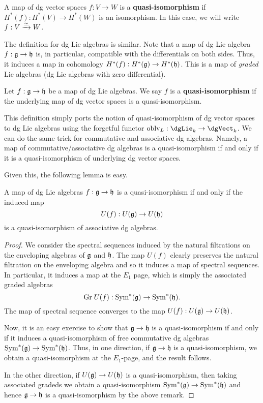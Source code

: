 \documentclass[11pt]{amsart}
\begin{document}
\begin{dfn}
A map of dg vector spaces $f : V \to W$ is a {\bf quasi-isomorphism} if $H^*(f) : H^*(V) \to H^*(W)$ is an isomorphism. 
In this case, we will write $f : V \xrightarrow{\simeq} W$. 
\end{dfn}

The definition for dg Lie algebras is similar. 
Note that a map of dg Lie algebra $f : \mathfrak g \to \mathfrak h$ is, in particular, compatible with the differentials on both sides. 
Thus, it induces a map in cohomology $H^*(f) : H^*(\mathfrak g) \to H^*(\mathfrak h)$.
This is a map of {\em graded} Lie algebras (dg Lie algebras with zero differential). 

\begin{dfn}
Let $f : \mathfrak g \to \mathfrak h$ be a map of dg Lie algebras. 
We say $f$ is a {\bf quasi-isomorphism} if the underlying map of dg vector spaces is a quasi-isomorphism.
\end{dfn}

This definition simply ports the notion of quasi-isomorphism of dg vector spaces to dg Lie algebras using the forgetful functor $\oblv_L : \dgLie_k \to \dgVect_k$. 
We can do the same trick for commutative and associative dg algebras.
Namely, a map of commutative/associative dg algebras is a quasi-isomorphism if and only if it is a quasi-isomorphism of underlying dg vector spaces. 

Given this, the following lemma is easy. 

\begin{lem}
A map of dg Lie algebras $f : \mathfrak g \to \mathfrak h$ is a quasi-isomorphism if and only if the induced map
\[
U(f) : U(\mathfrak g) \to U(\mathfrak h)
\]
is a quasi-isomorphism of associative dg algebras. 
\end{lem}
\begin{proof}
We consider the spectral sequences induced by the natural filtrations on the enveloping algebras of $\mathfrak g$ and $\mathfrak h$. 
The map $U(f)$ clearly preserves the natural filtration on the enveloping algebra and so it induces a map of spectral sequences. 
In particular, it induces a map at the $E_1$ page, which is simply the associated graded algebras
\[
{\rm Gr} \; U(f) : {\rm Sym}^*(\mathfrak g) \to {\rm Sym}^*(\mathfrak h) .
\] 
The map of spectral sequence converges to the map $U(f) : U(\mathfrak g) \to U(\mathfrak h)$. 

Now, it is an easy exercise to show that $\mathfrak g \to \mathfrak h$ is a quasi-isomorphism if and only if it induces a quasi-isomorphism of free commutative dg algebras ${\rm Sym}^*(\mathfrak g) \to {\rm Sym}^*(\mathfrak h)$. 
Thus, in one direction, if $\mathfrak g \to \mathfrak h$ is a quasi-isomorphism, we obtain a quasi-isomorphism at the $E_1$-page, and the result follows. 

In the other direction, if $U(\mathfrak g) \to U(\mathfrak h)$ is a quasi-isomorphism, then taking associated gradeds we obtain a quasi-isomorphism ${\rm Sym}^*(\mathfrak g) \to {\rm Sym}^*(\mathfrak h)$ and hence $\mathfrak g \to \mathfrak h$ is a quasi-isomorphism by the above remark. 
\end{proof}
\end{document}
